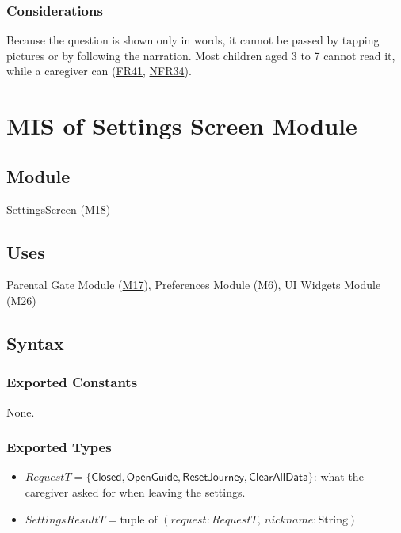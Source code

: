 \documentclass[10pt, titlepage]{article}
\newcommand{\srsurl}{https://team-hindsight.github.io/ophthamology-game/SRS/SRS.pdf}
\newcommand{\srsitemref}[2]{\href{\srsurl\#nameddest=#1}{#2}}
\newcommand{\misref}[2]{\hyperref[mis:#1]{M#2}}
\newcommand{\T}[1]{\mathit{#1}}          %
\newcommand{\V}[1]{\mathsf{#1}}          %
\begin{document}
\subsubsection{Considerations}

Because the question is shown only in words, it cannot be passed by tapping
pictures or by following the narration. Most children aged 3 to 7 cannot read
it, while a caregiver can (\srsitemref{FR_ParentGate}{FR41},
\srsitemref{NFR_StoreCompliance}{NFR34}).

\newpage
\section{MIS of Settings Screen Module} \label{mis:Settings}

\subsection{Module}

SettingsScreen (\misref{Settings}{18})

\subsection{Uses}

Parental Gate Module (\misref{Gate}{17}), Preferences Module (M6), UI Widgets
Module (\misref{Widgets}{26})

\subsection{Syntax}

\subsubsection{Exported Constants}

None.

\subsubsection{Exported Types}

\begin{itemize}
\item $\T{RequestT} = \{\V{Closed}, \V{OpenGuide}, \V{ResetJourney},
  \V{ClearAllData}\}$: what the caregiver asked for when leaving the settings.
\item $\T{SettingsResultT} = \text{tuple of } (\T{request} : \T{RequestT},\ \T{nickname} :
  \text{String})$
\end{itemize}
\end{document}
